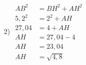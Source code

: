 2)
$
\begin{aligned}
A B^2 &= B H^2 + A H^2\\
5,2 ^ { 2 } &= 2 ^ { 2 } + A H\\
27,04 &= 4 + A H\\
A H &= 27,04 - 4\\
A H &= 23,04\\
AH &= \sqrt { 4,8 }
\end{aligned}
$
